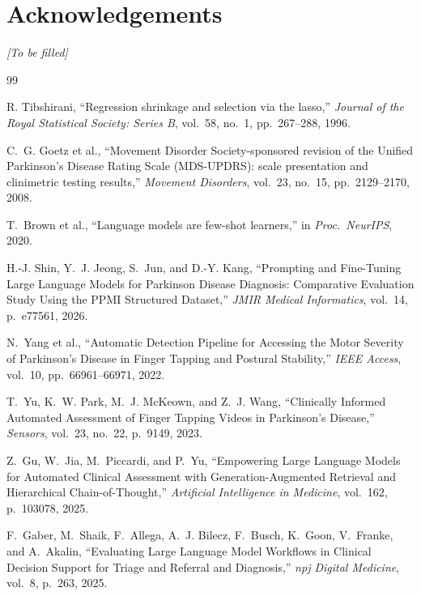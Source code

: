 \documentclass[conference]{IEEEtran}
\begin{document}
\section*{Acknowledgements}
\textit{[To be filled]}

\fi %

\begin{thebibliography}{99}

R. Tibshirani,
``Regression shrinkage and selection via the lasso,''
\textit{Journal of the Royal Statistical Society: Series B}, vol.~58, no.~1,
pp.~267--288, 1996.

C.~G. Goetz et al.,
``Movement Disorder Society-sponsored revision of the Unified Parkinson's Disease
Rating Scale (MDS-UPDRS): scale presentation and clinimetric testing results,''
\textit{Movement Disorders}, vol.~23, no.~15, pp.~2129--2170, 2008.

T.~Brown et al.,
``Language models are few-shot learners,''
in \textit{Proc.\ NeurIPS}, 2020.

H.-J. Shin, Y.~J. Jeong, S.~Jun, and D.-Y. Kang,
``Prompting and Fine-Tuning Large Language Models for Parkinson Disease
Diagnosis: Comparative Evaluation Study Using the PPMI Structured Dataset,''
\textit{JMIR Medical Informatics}, vol.~14, p.~e77561, 2026.

N.~Yang et al.,
``Automatic Detection Pipeline for Accessing the Motor Severity of
Parkinson's Disease in Finger Tapping and Postural Stability,''
\textit{IEEE Access}, vol.~10, pp.~66961--66971, 2022.

T.~Yu, K.~W. Park, M.~J. McKeown, and Z.~J. Wang,
``Clinically Informed Automated Assessment of Finger Tapping Videos
in Parkinson's Disease,''
\textit{Sensors}, vol.~23, no.~22, p.~9149, 2023.

Z.~Gu, W.~Jia, M.~Piccardi, and P.~Yu,
``Empowering Large Language Models for Automated Clinical Assessment
with Generation-Augmented Retrieval and Hierarchical Chain-of-Thought,''
\textit{Artificial Intelligence in Medicine}, vol.~162, p.~103078, 2025.

F.~Gaber, M.~Shaik, F.~Allega, A.~J. Bilecz, F.~Busch, K.~Goon,
V.~Franke, and A.~Akalin,
``Evaluating Large Language Model Workflows in Clinical Decision Support
for Triage and Referral and Diagnosis,''
\textit{npj Digital Medicine}, vol.~8, p.~263, 2025.


\end{thebibliography}
\end{document}
